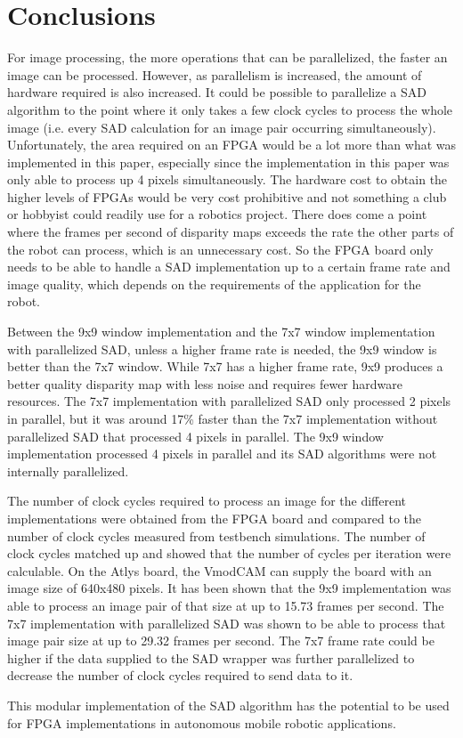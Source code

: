 \chapter{Conclusions}
\label{sec:concl}

For image processing, the more operations that can be parallelized, the faster an image can be processed. However, as parallelism is increased, the amount of hardware required is also increased. It could be possible to parallelize a SAD algorithm to the point where it only takes a few clock cycles to process the whole image (i.e. every SAD calculation for an image pair occurring simultaneously). Unfortunately, the area required on an FPGA would be a lot more than what was implemented in this paper, especially since the implementation in this paper was only able to process up 4 pixels simultaneously. The hardware cost to obtain the higher levels of FPGAs would be very cost prohibitive and not something a club or hobbyist could readily use for a robotics project. There does come a point where the frames per second of disparity maps exceeds the rate the other parts of the robot can process, which is an unnecessary cost. So the FPGA board only needs to be able to handle a SAD implementation up to a certain frame rate and image quality, which depends on the requirements of the application for the robot.

Between the 9x9 window implementation and the 7x7 window implementation with parallelized SAD, unless a higher frame rate is needed, the 9x9 window is better than the 7x7 window. While 7x7 has a higher frame rate, 9x9 produces a better quality disparity map with less noise and requires fewer hardware resources. The 7x7 implementation with parallelized SAD only processed 2 pixels in parallel, but it was around 17\% faster than the 7x7 implementation without parallelized SAD that processed 4 pixels in parallel. The 9x9 window implementation processed 4 pixels in parallel and its SAD algorithms were not internally parallelized.

The number of clock cycles required to process an image for the different implementations were obtained from the FPGA board and compared to the number of clock cycles measured from testbench simulations. The number of clock cycles matched up and showed that the number of cycles per iteration were calculable. On the Atlys board, the VmodCAM can supply the board with an image size of 640x480 pixels. It has been shown that the 9x9 implementation was able to process an image pair of that size at up to 15.73 frames per second. The 7x7 implementation with parallelized SAD was shown to be able to process that image pair size at up to 29.32 frames per second. The 7x7 frame rate could be higher if the data supplied to the SAD wrapper was further parallelized to decrease the number of clock cycles required to send data to it.

This modular implementation of the SAD algorithm has the potential to be used for FPGA implementations in autonomous mobile robotic applications.